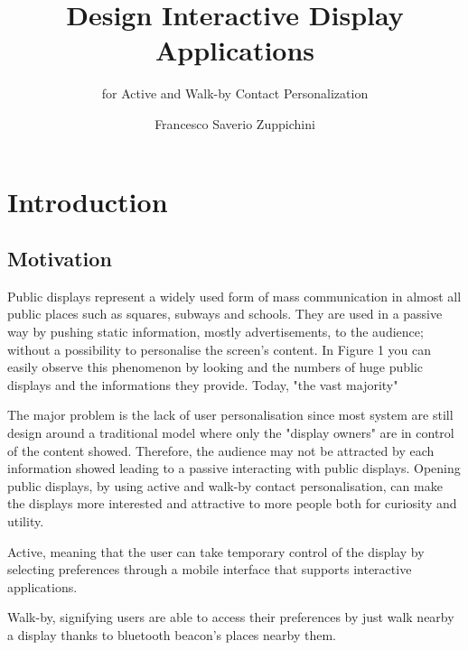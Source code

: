 \documentclass[]{usiinfbachelorproject}
\author{Francesco Saverio Zuppichini}
\title{Design Interactive Display Applications}
\subtitle{for Active and Walk-by Contact Personalization}
\begin{document}
\maketitle

\section{Introduction}
\subsection{Motivation}
Public displays represent a widely used form of mass communication in almost all public places such as squares, subways and schools. They are used in a passive way by pushing static information, mostly advertisements, to the audience; without a possibility to personalise the screen's content.  In Figure 1 you can easily observe this phenomenon by looking and the numbers of huge public displays and the informations they provide.
Today,  "the vast majority"

The major problem is the lack of user personalisation since most system are still design around a traditional model where only the "display owners" are in control of the content showed. Therefore, the audience may not be attracted by each information showed leading to a passive interacting with public displays. 
Opening public displays, by using active and walk-by contact personalisation, can make the displays more interested and attractive to more people both for curiosity and utility.

Active, meaning that the user can take temporary control of the display by selecting preferences through a mobile interface that supports interactive applications.

Walk-by, signifying users are able to access their preferences by just walk nearby a display thanks to bluetooth beacon's places nearby them.
 
\begin{figure}[H]
  \centering
  \hfill
  \caption{}
\end{figure} 
\end{document}
